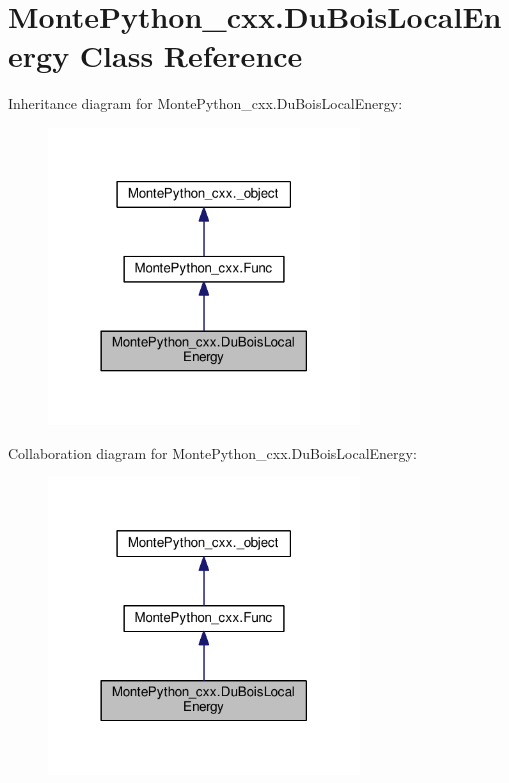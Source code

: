 \hypertarget{classMontePython__cxx_1_1DuBoisLocalEnergy}{}\section{Monte\+Python\+\_\+cxx.\+Du\+Bois\+Local\+Energy Class Reference}
\label{classMontePython__cxx_1_1DuBoisLocalEnergy}


Inheritance diagram for Monte\+Python\+\_\+cxx.\+Du\+Bois\+Local\+Energy\+:
\nopagebreak
\begin{figure}[H]
\begin{center}
\leavevmode
\includegraphics[width=234pt]{classMontePython__cxx_1_1DuBoisLocalEnergy__inherit__graph}
\end{center}
\end{figure}


Collaboration diagram for Monte\+Python\+\_\+cxx.\+Du\+Bois\+Local\+Energy\+:
\nopagebreak
\begin{figure}[H]
\begin{center}
\leavevmode
\includegraphics[width=234pt]{classMontePython__cxx_1_1DuBoisLocalEnergy__coll__graph}
\end{center}
\end{figure}
